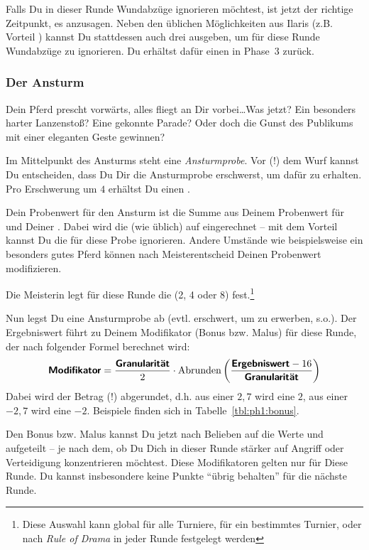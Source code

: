\documentclass[12pt,div=calc,a5paper,parskip=half]{scrartcl}
\begin{document}
Falls Du in dieser Runde Wundabzüge ignorieren möchtest, ist jetzt der richtige Zeitpunkt, es anzusagen. Neben den üblichen Möglichkeiten aus Ilaris (z.B. Vorteil ) kannst Du stattdessen auch drei \gp ausgeben, um für diese Runde Wundabzüge zu ignorieren. Du erhältst dafür einen \gp in Phase~3 zurück.

\subsubsection{Der Ansturm}
\begin{desc}
    Dein Pferd prescht vorwärts, alles fliegt an Dir vorbei\dots Was jetzt? Ein besonders harter Lanzenstoß? Eine gekonnte Parade? Oder doch die Gunst des Publikums mit einer eleganten Geste gewinnen?
\end{desc}

Im Mittelpunkt des Ansturms steht eine \emph{Ansturmprobe}. Vor (!) dem Wurf kannst Du entscheiden, dass Du Dir die Ansturmprobe erschwerst, um dafür \gp zu erhalten. Pro Erschwerung um $4$ erhältst Du einen \gp. 

Dein Probenwert für den Ansturm ist die Summe aus Deinem Probenwert für  und Deiner . Dabei wird die  (wie üblich) auf  eingerechnet -- mit dem Vorteil  kannst Du die  für diese Probe ignorieren. Andere Umstände wie beispielsweise ein besonders gutes Pferd können nach Meisterentscheid Deinen Probenwert modifizieren. 

Die Meisterin legt für diese Runde die  (2, 4 oder 8) fest.\footnote{Diese Auswahl kann global für alle Turniere, für ein bestimmtes Turnier, oder nach \emph{Rule of Drama} in jeder Runde festgelegt werden} 

Nun legst Du eine Ansturmprobe ab (evtl. erschwert, um \gp zu erwerben, s.o.). Der Ergebniswert führt zu Deinem Modifikator (Bonus bzw. Malus) für diese Runde, der nach folgender Formel berechnet wird:
\begin{equation*}
\textsf{\textbf{Modifikator}} = \frac{\textsf{\textbf{Granularität}}}{2} \cdot \mathrm{Abrunden}\left(\frac{\textsf{\textbf{Ergebniswert}} - 16}{\textsf{\textbf{Granularität}}}\right) 
\end{equation*}
Dabei wird der Betrag (!) abgerundet, d.h. aus einer $2{,}7$ wird eine $2$, aus einer $-2{,}7$ wird eine $-2$. Beispiele finden sich in Tabelle~\ref{tbl:ph1:bonus}. 

Den Bonus bzw. Malus kannst Du jetzt nach Belieben auf die Werte \modAT und \modVT aufgeteilt -- je nach dem, ob Du Dich in dieser Runde stärker auf Angriff oder Verteidigung konzentrieren möchtest. Diese Modifikatoren gelten nur für Diese Runde. Du kannst insbesondere keine Punkte \enquote{übrig behalten} für die nächste Runde.
\end{document}
